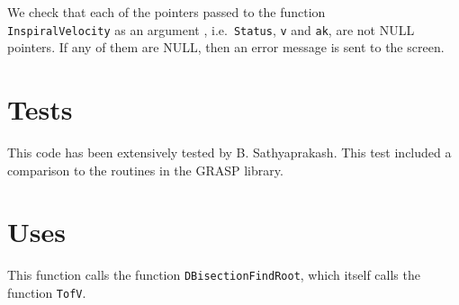\documentclass[12pt]{article}
\begin{document}
We check that each of the pointers passed to the function \\ \texttt{InspiralVelocity} as an argument , i.e.\ \texttt{Status}, \texttt{v} and \texttt{ak}, are not NULL pointers. If any of them are NULL, then an error message is sent to the screen.


\section{Tests}

This code has been extensively tested by B. Sathyaprakash. This test included a comparison to the routines in the GRASP library.

\section{Uses}

This function calls the function \texttt{DBisectionFindRoot},  which itself calls the function \texttt{TofV}.
\end{document}
